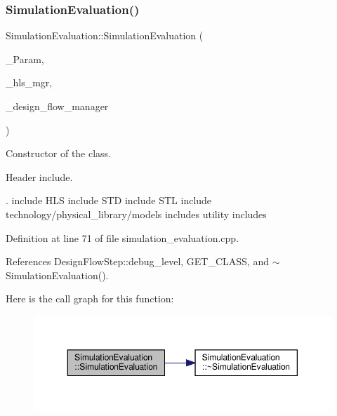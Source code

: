 \subsubsection{\texorpdfstring{Simulation\+Evaluation()}{SimulationEvaluation()}}
{\footnotesize\ttfamily Simulation\+Evaluation\+::\+Simulation\+Evaluation (\begin{DoxyParamCaption}\item[{const \hyperlink{Parameter_8hpp_a37841774a6fcb479b597fdf8955eb4ea}{Parameter\+Const\+Ref}}]{\+\_\+\+Param,  }\item[{const \hyperlink{hls__manager_8hpp_acd3842b8589fe52c08fc0b2fcc813bfe}{H\+L\+S\+\_\+manager\+Ref}}]{\+\_\+hls\+\_\+mgr,  }\item[{const Design\+Flow\+Manager\+Const\+Ref}]{\+\_\+design\+\_\+flow\+\_\+manager }\end{DoxyParamCaption})}



Constructor of the class. 

Header include.

. include H\+LS include S\+TD include S\+TL include technology/physical\+\_\+library/models includes utility includes 

Definition at line 71 of file simulation\+\_\+evaluation.\+cpp.



References Design\+Flow\+Step\+::debug\+\_\+level, G\+E\+T\+\_\+\+C\+L\+A\+SS, and $\sim$\+Simulation\+Evaluation().

Here is the call graph for this function\+:
\nopagebreak
\begin{figure}[H]
\begin{center}
\leavevmode
\includegraphics[width=350pt]{d1/df7/classSimulationEvaluation_a9a6181408bb5dc0db7490adb3bb75efd_cgraph}
\end{center}
\end{figure}
\mbox{\label{classSimulationEvaluation_aecec6c909c3c017be7ed1e65f23f8452}} 
